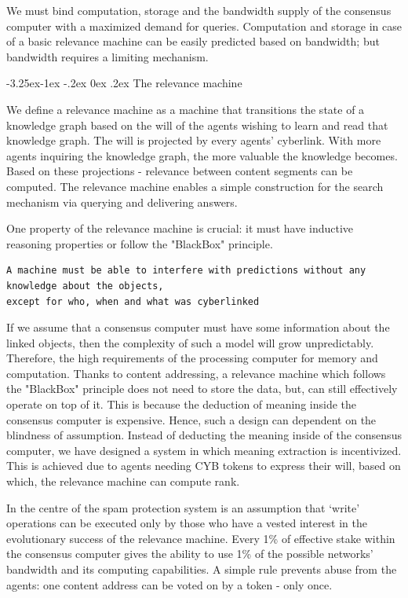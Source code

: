 \documentclass[8pt,oneside]{amsart}
\makeatletter
\renewcommand\subsection{\@startsection{subsection}{2}{\z@}%
                                     {-3.25ex\@plus -1ex \@minus -.2ex}%
                                     {0ex \@plus .2ex}%
                                     {\play\Large}}%
\newcommand{\titleSection}[1]{\subsection{#1}}
\makeatother
\begin{document}
\begin{Abstract}
We must bind computation, storage and the bandwidth supply of the consensus computer with a maximized demand for queries. Computation and storage in case of a basic relevance machine can be easily predicted based on bandwidth; but bandwidth requires a limiting mechanism.

\titleSection{The relevance machine}\label{The relevance-machine}

We define a relevance machine as a machine that transitions the state of a knowledge graph based on the will of the agents wishing to learn and read that knowledge graph. The will is projected by every agents' cyberlink. With more agents inquiring the knowledge graph, the more valuable the knowledge becomes. Based on these projections - relevance between content segments can be computed. The relevance machine enables a simple construction for the search mechanism via querying and delivering answers.

One property of the relevance machine is crucial: it must have inductive reasoning properties or follow the "BlackBox" principle.

\begin{lstlisting}
A machine must be able to interfere with predictions without any knowledge about the objects,
except for who, when and what was cyberlinked
\end{lstlisting}

If we assume that a consensus computer must have some information about the linked objects, then the complexity of such a model will grow unpredictably. Therefore, the high requirements of the processing computer for memory and computation. Thanks to content addressing, a relevance machine which follows the "BlackBox" principle does not need to store the data, but, can still effectively operate on top of it. This is because the deduction of meaning inside the consensus computer is expensive. Hence, such a design can dependent on the blindness of assumption. Instead of deducting the meaning inside of the consensus computer, we have designed a system in which meaning extraction is incentivized. This is achieved due to agents needing CYB tokens to express their will, based on which, the relevance machine can compute rank.

In the centre of the spam protection system is an assumption that ‘write’ operations can be executed only by those who have a vested interest in the evolutionary success of the relevance machine. Every 1\% of effective stake within the consensus computer gives the ability to use 1\% of the possible networks' bandwidth and its computing capabilities. A simple rule prevents abuse from the agents: one content address can be voted on by a token - only once.


\end{Abstract}
\end{document}
